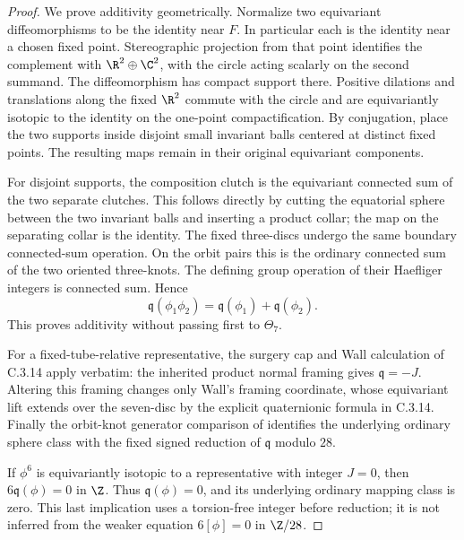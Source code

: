 \begin{proof}
We prove additivity geometrically. Normalize two equivariant
diffeomorphisms to be the identity near $F$. In particular each
is the identity near a chosen fixed point. Stereographic
projection from that point identifies the complement with
$\R^2\oplus\C^2$, with the circle acting scalarly on the
second summand. The diffeomorphism has compact support there.
Positive dilations and translations along the fixed $\R^2$
commute with the circle and are equivariantly isotopic to the
identity on the one-point compactification. By conjugation,
place the two supports inside disjoint small invariant balls
centered at distinct fixed points. The resulting maps remain
in their original equivariant components.

For disjoint supports, the composition clutch is the
equivariant connected sum of the two separate clutches.
This follows directly by cutting the equatorial sphere between
the two invariant balls and inserting a product collar; the
map on the separating collar is the identity. The fixed
three-discs undergo the same boundary connected-sum operation.
On the orbit pairs this is the ordinary connected sum of
the two oriented three-knots. The defining group operation
of their Haefliger integers is connected sum. Hence
\[
 \mathfrak q(\phi_1\phi_2)
 =\mathfrak q(\phi_1)+\mathfrak q(\phi_2).
\]
This proves additivity without passing first to $\Theta_7$.

For a fixed-tube-relative representative, the surgery cap and
Wall calculation of C.3.14 apply verbatim: the inherited product
normal framing gives $\mathfrak q=-J$. Altering this framing
changes only Wall's framing coordinate, whose equivariant lift
extends over the seven-disc by the explicit quaternionic
formula in C.3.14. Finally the orbit-knot generator comparison
of \citet[Example 7.14 and Proposition 7.15]{Davis1982D}
identifies the underlying ordinary sphere class with the fixed
signed reduction of $\mathfrak q$ modulo $28$.

If $\phi^6$ is equivariantly isotopic to a representative with
integer $J=0$, then $6\mathfrak q(\phi)=0$ in $\Z$.
Thus $\mathfrak q(\phi)=0$, and its underlying ordinary
mapping class is zero. This last implication uses a torsion-free
integer before reduction; it is not inferred from the weaker
equation $6[\phi]=0$ in $\Z/28$.
\end{proof}
